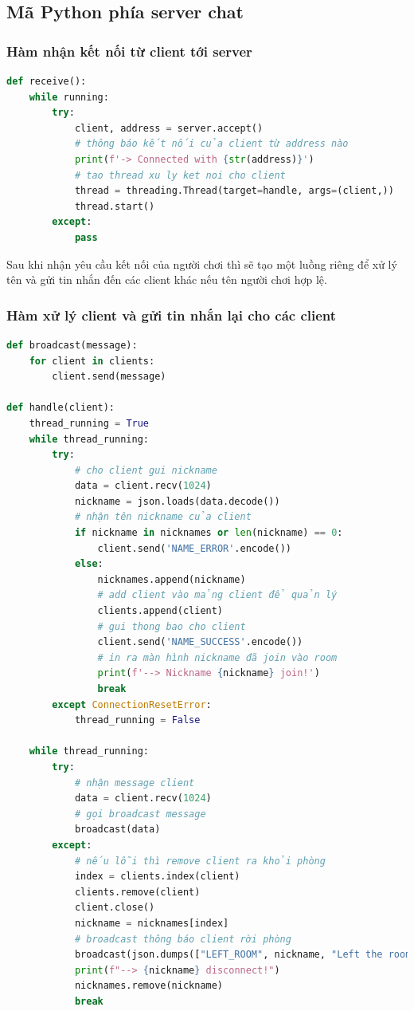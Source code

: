 \documentclass[a4paper]{article}
\begin{document}
\subsection{Mã Python phía server chat}
\subsubsection{Hàm nhận kết nối từ client tới server}
\begin{lstlisting}[language=Python]
def receive():
    while running:
        try:
            client, address = server.accept()
            # thông báo kết nối của client từ address nào
            print(f'-> Connected with {str(address)}')
            # tao thread xu ly ket noi cho client
            thread = threading.Thread(target=handle, args=(client,))
            thread.start()
        except:
            pass
\end{lstlisting}
Sau khi nhận yêu cầu kết nối của người chơi thì sẽ tạo một luồng riêng để xử lý tên và gửi tin nhắn đến các client khác nếu tên người chơi hợp lệ.


\subsubsection{Hàm xử lý client và gửi tin nhắn lại cho các client}
\begin{lstlisting}[language=Python]
def broadcast(message):
    for client in clients:
        client.send(message)

def handle(client):
    thread_running = True
    while thread_running:
        try:
            # cho client gui nickname
            data = client.recv(1024)
            nickname = json.loads(data.decode())
            # nhận tên nickname của client
            if nickname in nicknames or len(nickname) == 0:
                client.send('NAME_ERROR'.encode())
            else:
                nicknames.append(nickname)
                # add client vào mảng client để quản lý
                clients.append(client)
                # gui thong bao cho client
                client.send('NAME_SUCCESS'.encode())
                # in ra màn hình nickname đã join vào room
                print(f'--> Nickname {nickname} join!')
                break
        except ConnectionResetError:
            thread_running = False

    while thread_running:
        try:
            # nhận message client
            data = client.recv(1024)
            # gọi broadcast message
            broadcast(data)
        except:
            # nếu lỗi thì remove client ra khỏi phòng
            index = clients.index(client)
            clients.remove(client)
            client.close()
            nickname = nicknames[index]
            # broadcast thông báo client rời phòng
            broadcast(json.dumps(["LEFT_ROOM", nickname, "Left the room!"]).encode())
            print(f"--> {nickname} disconnect!")
            nicknames.remove(nickname)
            break
\end{lstlisting}
\end{document}
